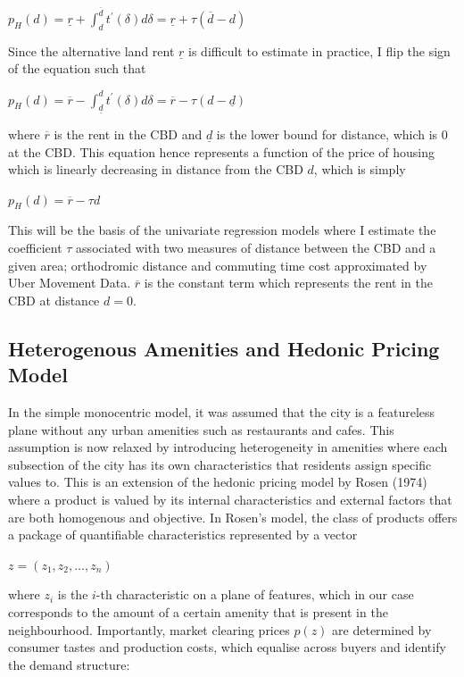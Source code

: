 \documentclass{article}
\begin{document}
\begin{center}
$p _ { H } ( d ) = \underline { r } + \int _ { d } ^ { \overline { d } } t ^ { \prime } ( \delta ) d \delta = \underline { r } + \tau ( \overline { d } - d )$
\end{center}
Since the alternative land rent $\underline{r}$ is difficult to estimate in practice, I flip the sign of the equation such that 
\begin{center}
$p _ { H } ( d ) = \overline { r } - \int _ { \underline { d } } ^ { d } t ^ { \prime } ( \delta ) d \delta = \overline { r } - \tau ( d - \underline { d } )$
\end{center}
where $\overline{r}$ is the rent in the CBD and $\underline{d}$ is the lower bound for distance, which is 0 at the CBD. This equation hence represents a function of the price of housing which is linearly decreasing in distance from the CBD $d$, which is simply
\begin{center}
$p _ { H } ( d ) = \overline { r } - \tau d$
\end{center}
This will be the basis of the univariate regression models where I estimate the coefficient $\tau$ associated with two measures of distance between the CBD and a given area; orthodromic distance and commuting time cost approximated by Uber Movement Data. $\overline{r}$ is the constant term which represents the rent in the CBD at distance $d = 0$.

\subsection{Heterogenous Amenities and Hedonic Pricing Model}
In the simple monocentric model, it was assumed that the city is a featureless plane without any urban amenities such as restaurants and cafes. This assumption is now relaxed by introducing heterogeneity in amenities where each subsection of the city has its own characteristics that residents assign specific values to. This is an extension of the hedonic pricing model by Rosen (1974) where a product is valued by its internal characteristics and external factors that are both homogenous and objective. In Rosen's model, the class of products offers a package of quantifiable characteristics represented by a vector 

\begin{center}
    $z = \left( z _ { 1 } , z _ { 2 } , \dots , z _ { n } \right)$
\end{center}

where $z_i$ is the $i$-th characteristic on a plane of features, which in our case corresponds to the amount of a certain amenity that is present in the neighbourhood. Importantly, market clearing prices $p(z)$ are determined by consumer tastes and production costs, which equalise across buyers and identify the demand structure:
\end{document}
